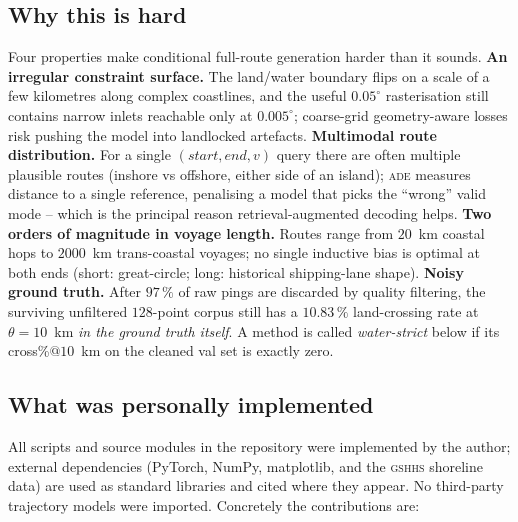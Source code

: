 \documentclass[oneside, a4paper, onecolumn, 11pt]{article}
\newcommand{\ade}{\textsc{ade}}
\begin{document}
\subsection{Why this is hard}\label{sec:hard}

Four properties make conditional full-route generation harder than it
sounds.  \textbf{An irregular constraint surface.}  The land/water
boundary flips on a scale of a few kilometres along complex
coastlines, and the useful $0.05^\circ$ rasterisation still contains
narrow inlets reachable only at $0.005^\circ$; coarse-grid
geometry-aware losses risk pushing the model into landlocked
artefacts.  \textbf{Multimodal route distribution.}  For a single
$(start, end, v)$ query there are often multiple plausible routes
(inshore vs offshore, either side of an island); \ade{} measures
distance to a single reference, penalising a model that picks the
``wrong'' valid mode -- which is the principal reason
retrieval-augmented decoding helps.  \textbf{Two orders of magnitude
in voyage length.}  Routes range from $20$~km coastal hops to
$2000$~km trans-coastal voyages; no single inductive bias is optimal
at both ends (short: great-circle; long: historical shipping-lane
shape).  \textbf{Noisy ground truth.}  After $97\,\%$ of raw pings
are discarded by quality filtering, the surviving unfiltered
$128$-point corpus still has a $10.83\,\%$ land-crossing rate at
$\theta = 10$~km \emph{in the ground truth itself}.  A method is
called \emph{water-strict} below if its cross\%$@10$~km on the
cleaned val set is exactly zero.

\subsection{What was personally implemented}

All scripts and source modules in the repository were implemented by
the author; external dependencies (PyTorch, NumPy, matplotlib, and the
\textsc{gshhs} shoreline data) are used as standard libraries and
cited where they appear.  No third-party trajectory models were
imported.  Concretely the contributions are:
\end{document}
